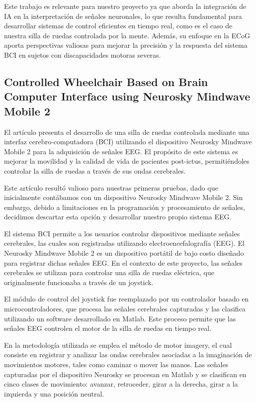 \documentclass{article}
\begin{document}
Este trabajo es relevante para nuestro proyecto ya que aborda la integración de IA en la interpretación de señales neuronales, lo que resulta fundamental para desarrollar sistemas de control eficientes en tiempo real, como es el caso de nuestra silla de ruedas controlada por la mente. Además, su enfoque en la ECoG aporta perspectivas valiosas para mejorar la precisión y la respuesta del sistema BCI en sujetos con discapacidades motoras severas.

\subsection{Controlled Wheelchair Based on Brain Computer Interface using Neurosky Mindwave Mobile 2}

El artículo presenta el desarrollo de una silla de ruedas controlada mediante una interfaz cerebro-computadora (BCI) utilizando el dispositivo Neurosky Mindwave Mobile 2 para la adquisición de señales EEG. El propósito de este sistema es mejorar la movilidad y la calidad de vida de pacientes post-ictus, permitiéndoles controlar la silla de ruedas a través de sus ondas cerebrales.

Este artículo resultó valioso para nuestras primeras pruebas, dado que inicialmente contábamos con un dispositivo Neurosky Mindwave Mobile 2. Sin embargo, debido a limitaciones en la programación y procesamiento de señales, decidimos descartar esta opción y desarrollar nuestro propio sistema EEG.

El sistema BCI permite a los usuarios controlar dispositivos mediante señales cerebrales, las cuales son registradas utilizando electroencefalografía (EEG). El Neurosky Mindwave Mobile 2 es un dispositivo portátil de bajo costo diseñado para registrar dichas señales EEG. En el contexto de este proyecto, las señales cerebrales se utilizan para controlar una silla de ruedas eléctrica, que originalmente funcionaba a través de un joystick.

El módulo de control del joystick fue reemplazado por un controlador basado en microcontroladores, que procesa las señales cerebrales capturadas y las clasifica utilizando un software desarrollado en Matlab. Este proceso permite que las señales EEG controlen el motor de la silla de ruedas en tiempo real.

En la metodología utilizada se emplea el método de motor imagery, el cual consiste en registrar y analizar las ondas cerebrales asociadas a la imaginación de movimientos motores, tales como caminar o mover las manos. Las señales capturadas por el dispositivo Neurosky se procesan en Matlab y se clasifican en cinco clases de movimiento: avanzar, retroceder, girar a la derecha, girar a la izquierda y una posición neutral.
\end{document}
